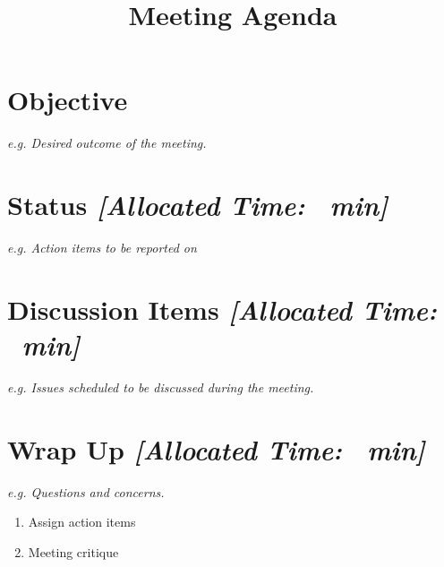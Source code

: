\title{Meeting Agenda}
\maketitle

\section{Objective}
\textit{e.g. Desired outcome of the meeting.} \newline  %



\section{Status \textit{[Allocated Time: \statusTime\ min]}}
\textit{e.g. Action items to be reported on}  %
\begin{itemize}
    
\end{itemize}

\section{Discussion Items \textit{[Allocated Time: \discTime\ min]}} 
\textit{e.g. Issues scheduled to be discussed during the meeting.}  %
    
    
\section{Wrap Up \textit{[Allocated Time: \wrapTime\ min]}}
\textit{e.g. Questions and concerns.}  %
\begin{enumerate}
    \item Assign action items
    \item Meeting critique
\end{enumerate}